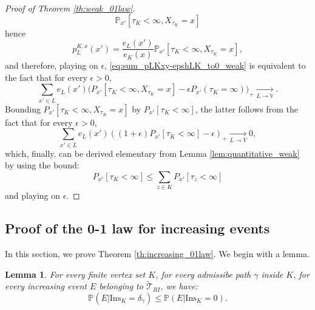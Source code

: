 \documentclass[12pt,a4paper]{article}
\newtheorem{lemma}[theo]{Lemma}
\newcommand{\1}[1]{{\mathbf 1}{\{#1\}}}
\newcommand{\8}{{\infty}}
\newcommand{\p}{\mathbb{P}}
\newcommand{\In}{\mathrm{Ins}}
\begin{document}
\begin{proof}[Proof of Theorem \ref{th:weak_01law}]
\begin{equation}
   \p_{x'}[\tau_K < \infty, X_{\tau_K} = x]
\end{equation}
hence
\begin{equation}
  p_L^{K, x}(x')= \frac {e_L(x')}{ e_K(x)} 
  \p_{x'}[\tau_K < \infty, X_{\tau_K} = x],
\end{equation}
and therefore, playing on $\epsilon$, \eqref{eq:sum_pLKxy-epshLK_to0_weak} is equivalent to the fact that for every $\epsilon>0$, 
\begin{equation}
    \sum_{x'\in   L}  e_L(x')  \big(  P_{x'}[\tau_K<\infty, X_{\tau_K}=x]  -\epsilon P_{x'}(\tau_K=\infty) \big)_+  \underset{L \to \mathbb{V}}{\longrightarrow}.
\end{equation}
Bounding $P_{x'}[\tau_K<\infty, X_{\tau_K}=x]$ by $P_{x'}[\tau_K<\infty]$, the latter follows from the fact that for every $\epsilon>0$,
\begin{equation}
    \sum_{x'\in  L} e_L(x') \left((1+\epsilon) P_{x'}[\tau_K<\infty]-\epsilon \right)_+  \underset{L \to V}\longrightarrow 0,
  \end{equation}
which, finally, can be derived elementary from Lemma \ref{lem:quantitative_weak} by using the bound:
\begin{equation}
  P_{x'}[\tau_K<\infty] \le \sum_{z\in K}  P_{x'}[\tau_z<\infty]
\end{equation}
and playing on $\epsilon$.
\end{proof}


\subsection{Proof of the 0-1 law for increasing events}

In this section, we prove Theorem \ref{th:increasing_01law}. We begin with a lemma.

\begin{lemma}\label{lem:for_01_increasing}
  For every finite vertex set $K$, for every admissibe path $\gamma$ inside $K$, for every increasing event $E$ belonging to $\widetilde{\mathcal{T}}_{RI}$, we have:
  \begin{equation}
    \p(E | \In_K=\delta_\gamma) \le \p(E| \In_K=0).
  \end{equation}
\end{lemma}
\end{document}
